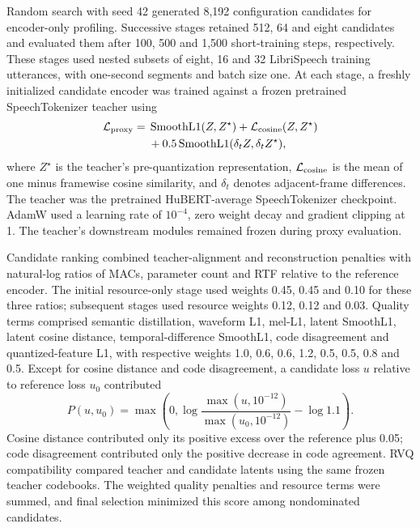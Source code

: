 \documentclass[final,5p,times,twocolumn]{elsarticle}
\begin{document}
Random search with seed 42 generated 8,192 configuration candidates for encoder-only profiling. Successive stages retained 512, 64 and eight candidates and evaluated them after 100, 500 and 1,500 short-training steps, respectively. These stages used nested subsets of eight, 16 and 32 LibriSpeech training utterances, with one-second segments and batch size one. At each stage, a freshly initialized candidate encoder was trained against a frozen pretrained SpeechTokenizer teacher using
\begin{equation}
\begin{split}
 \mathcal L_{\rm proxy}={}&
 \operatorname{SmoothL1}(Z,Z^\star)
 +\mathcal L_{\rm cosine}(Z,Z^\star)\\
 &+0.5\operatorname{SmoothL1}
       (\delta_t Z,\delta_t Z^\star),
\end{split}
\end{equation}
where $Z^\star$ is the teacher's pre-quantization representation, $\mathcal L_{\rm cosine}$ is the mean of one minus framewise cosine similarity, and $\delta_t$ denotes adjacent-frame differences. The teacher was the pretrained HuBERT-average SpeechTokenizer checkpoint. AdamW used a learning rate of $10^{-4}$, zero weight decay and gradient clipping at 1. The teacher's downstream modules remained frozen during proxy evaluation.

Candidate ranking combined teacher-alignment and reconstruction penalties with natural-log ratios of MACs, parameter count and RTF relative to the reference encoder. The initial resource-only stage used weights 0.45, 0.45 and 0.10 for these three ratios; subsequent stages used resource weights 0.12, 0.12 and 0.03. Quality terms comprised semantic distillation, waveform L1, mel-L1, latent SmoothL1, latent cosine distance, temporal-difference SmoothL1, code disagreement and quantized-feature L1, with respective weights 1.0, 0.6, 0.6, 1.2, 0.5, 0.5, 0.8 and 0.5. Except for cosine distance and code disagreement, a candidate loss $u$ relative to reference loss $u_0$ contributed
\begin{equation}
 P(u,u_0)=\max\!\left(0,\log\frac{\max(u,10^{-12})}
 {\max(u_0,10^{-12})}-\log 1.1\right).
\end{equation}
Cosine distance contributed only its positive excess over the reference plus 0.05; code disagreement contributed only the positive decrease in code agreement. RVQ compatibility compared teacher and candidate latents using the same frozen teacher codebooks. The weighted quality penalties and resource terms were summed, and final selection minimized this score among nondominated candidates.
\end{document}

